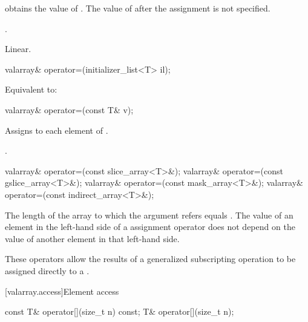 \begin{itemdescr}
\pnum
\effects
{} obtains the value of .
The value of  after the assignment is not specified.

\pnum
\returns
{}.

\pnum
\complexity
Linear.
\end{itemdescr}

%
\begin{itemdecl}
valarray& operator=(initializer_list<T> il);
\end{itemdecl}

\begin{itemdescr}
\pnum
\effects
Equivalent to: 
\end{itemdescr}


%
\begin{itemdecl}
valarray& operator=(const T& v);
\end{itemdecl}

\begin{itemdescr}
\pnum
\effects
Assigns  to each element of .

\pnum
\returns
{}.
\end{itemdescr}

%
\begin{itemdecl}
valarray& operator=(const slice_array<T>&);
valarray& operator=(const gslice_array<T>&);
valarray& operator=(const mask_array<T>&);
valarray& operator=(const indirect_array<T>&);
\end{itemdecl}

\begin{itemdescr}
\pnum
\expects
The length of the array to which the argument refers equals .
The value of an element in the left-hand side of a  assignment
operator does not depend on the value of another element in that left-hand side.

\pnum
These operators allow the results of a generalized subscripting operation
to be assigned directly to a
.
\end{itemdescr}

[valarray.access]{Element access}

%
\begin{itemdecl}
const T&  operator[](size_t n) const;
T& operator[](size_t n);
\end{itemdecl}

